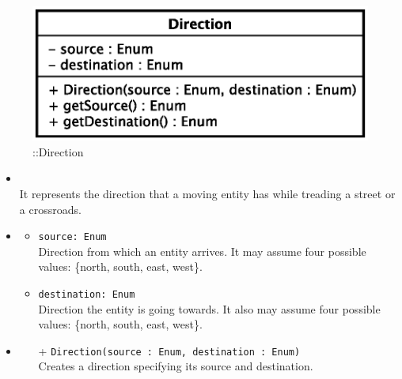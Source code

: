 \begin{figure}[h]
\centering
\includegraphics[scale=0.6,keepaspectratio]{images/solution/direction.eps}
\caption{\pReactiveComponentUtil::Direction}
\label{fig:sd-app-direction}
\end{figure}
\FloatBarrier
\begin{itemize}
  \item \textbf{\descr} \\
    It represents the direction that a moving entity has while treading a
    street or a crossroads.
  \item \textbf{\attrs}
  \begin{itemize}
    \item \texttt{source: Enum} \\
Direction from which an entity arrives. It may assume four possible
values: \{north, south, east, west\}.
    \item \texttt{destination: Enum} \\
Direction the entity is going towards.  It also may assume four possible
values: \{north, south, east, west\}.
  \end{itemize}
  \item \textbf{\ops}
  \begin{itemize}
    \item[+] \texttt{Direction(source : Enum, destination : Enum)} \\
    Creates a direction specifying its source and destination.
    \end{itemize}
\end{itemize}
